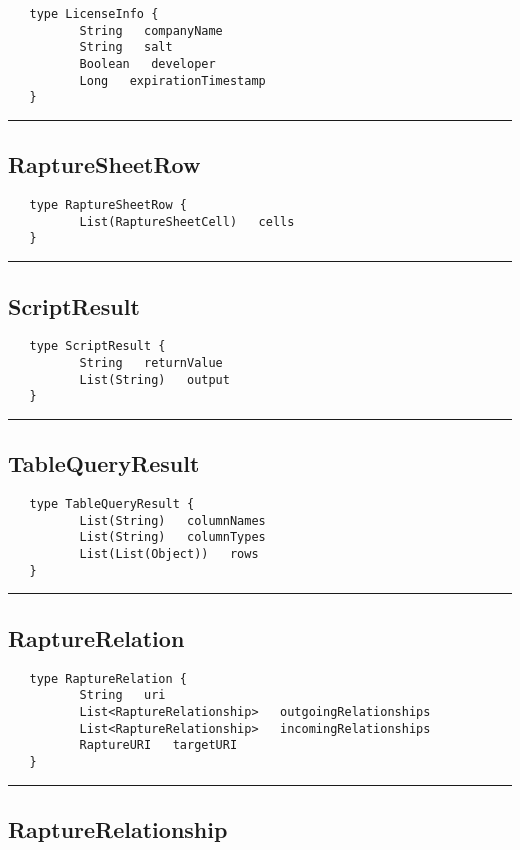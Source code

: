 \begin{verbatim}
   type LicenseInfo {
          String   companyName
          String   salt
          Boolean   developer
          Long   expirationTimestamp
   }
\end{verbatim}

\rule{15cm}{2pt}
\subsection{RaptureSheetRow}
\label{type:RaptureSheetRow}

\begin{verbatim}
   type RaptureSheetRow {
          List(RaptureSheetCell)   cells
   }
\end{verbatim}

\rule{15cm}{2pt}
\subsection{ScriptResult}
\label{type:ScriptResult}

\begin{verbatim}
   type ScriptResult {
          String   returnValue
          List(String)   output
   }
\end{verbatim}

\rule{15cm}{2pt}
\subsection{TableQueryResult}
\label{type:TableQueryResult}

\begin{verbatim}
   type TableQueryResult {
          List(String)   columnNames
          List(String)   columnTypes
          List(List(Object))   rows
   }
\end{verbatim}

\rule{15cm}{2pt}
\subsection{RaptureRelation}
\label{type:RaptureRelation}

\begin{verbatim}
   type RaptureRelation {
          String   uri
          List<RaptureRelationship>   outgoingRelationships
          List<RaptureRelationship>   incomingRelationships
          RaptureURI   targetURI
   }
\end{verbatim}

\rule{15cm}{2pt}
\subsection{RaptureRelationship}
\label{type:RaptureRelationship}

